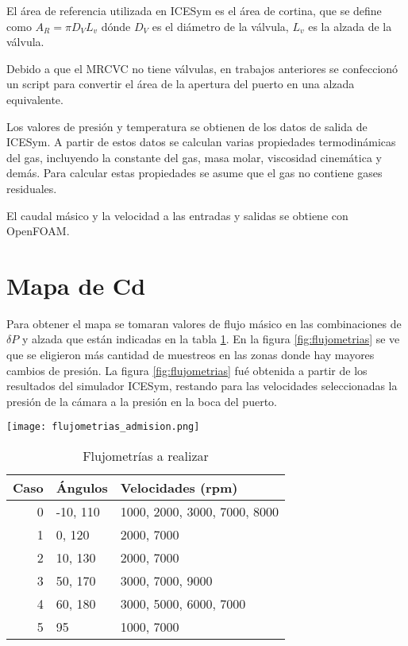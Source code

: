 El área de referencia utilizada en ICESym es el área de cortina, que se define
como $A_{R} = \pi D_{V} L_{{v}}$ dónde $D_{V}$ es el diámetro de la válvula,
$L_{v}$ es la alzada de la válvula.

Debido a que el MRCVC no tiene válvulas, en trabajos anteriores se confeccionó
un script para convertir el área de la apertura del puerto en una alzada
equivalente.

Los valores de presión y temperatura se obtienen de los datos de salida de
ICESym.
%
A partir de estos datos se calculan varias propiedades termodinámicas del gas,
incluyendo la constante del gas, masa molar, viscosidad cinemática y demás.
%
Para calcular estas propiedades se asume que el gas no contiene gases residuales.

El caudal másico y la velocidad a las entradas y salidas se obtiene con
OpenFOAM.



\section{Mapa de Cd}
%
Para obtener el mapa se tomaran valores de flujo másico en las combinaciones de
$\delta P$ y alzada que están indicadas en la tabla \ref{tab:casos}.
%
En la figura \ref{fig:flujometrias} se ve que se eligieron más cantidad de
muestreos en las zonas donde hay mayores cambios de presión.
%
La figura \ref{fig:flujometrias} fué obtenida a partir de los resultados del
simulador ICESym, restando para las velocidades seleccionadas la presión de la
cámara a la presión en la boca del puerto.

\begin{sidewaysfigure}
    \texttt{[image: flujometrias\_admision.png]}
    \caption{Flujometrías para el puerto de Admisión}
    \label{fig:flujometrias}
\end{sidewaysfigure}

\begin{table}
    \centering
    \begin{tabular}{rll} \toprule
        Caso & Ángulos & Velocidades (rpm) \\ \midrule
        0 & -10, 110 & 1000, 2000, 3000, 7000, 8000 \\
        1 & 0, 120 & 2000, 7000 \\
        2 & 10, 130 & 2000, 7000 \\
        3 & 50, 170 & 3000, 7000, 9000 \\
        4 & 60, 180 & 3000, 5000, 6000, 7000 \\
        5 & 95 & 1000, 7000\\ \bottomrule
    \end{tabular}
    \caption{Flujometrías a realizar}
    \label{tab:casos}
\end{table}

